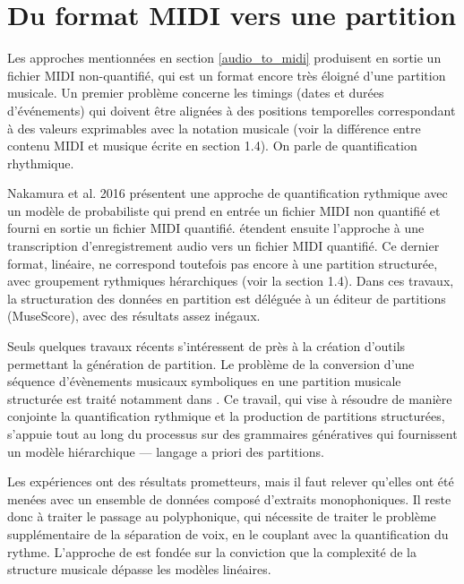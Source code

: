 \section{Du format MIDI vers une partition}
Les approches mentionnées en section \ref{audio_to_midi} produisent en sortie
un fichier MIDI non-quantifié, qui est un format encore très éloigné d'une
partition musicale. Un premier problème concerne les timings (dates et durées
d'événements) qui doivent être alignées à des positions temporelles
correspondant à des valeurs exprimables avec la notation musicale (voir la
différence entre contenu MIDI et musique écrite en section 1.4). On parle de
quantification rhythmique.

Nakamura et al. 2016 présentent une approche de quantification rythmique avec
un modèle de probabiliste qui prend en entrée un fichier MIDI non quantifié
et fourni en sortie un fichier MIDI quantifié. \cite{shibata} étendent
ensuite l'approche à une transcription d'enregistrement audio vers un fichier
MIDI quantifié. Ce dernier format, linéaire, ne correspond toutefois pas encore
à une partition structurée,  avec groupement rythmiques hérarchiques (voir la
section 1.4). Dans ces travaux, la structuration des données en partition est
déléguée à un éditeur de partitions (MuseScore), avec des résultats assez
inégaux.

Seuls quelques travaux récents s’intéressent de près à la création d’outils
permettant la génération de partition. Le problème de la conversion d'une
séquence d'évènements musicaux symboliques en une partition musicale structurée
est traité notamment dans \cite{foscarin}. Ce travail, qui vise à
résoudre de manière conjointe la quantification rythmique et la production de
partitions structurées, s’appuie tout au long du processus sur des grammaires
génératives qui fournissent un modèle hiérarchique — langage a priori des
partitions.

Les expériences ont des résultats prometteurs, mais il faut relever qu’elles
ont été menées avec un ensemble de données composé d'extraits monophoniques. Il
reste donc à traiter le passage au polyphonique, qui nécessite de traiter le
problème supplémentaire de la séparation de voix, en le couplant avec la
quantification du rythme. L'approche de \cite{foscarin} est fondée sur la
conviction que la complexité de la structure musicale dépasse les modèles
linéaires.

